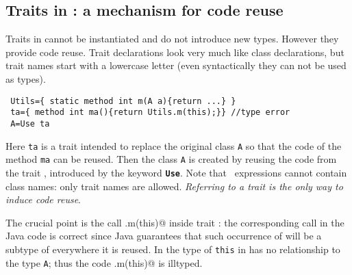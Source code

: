 \saveSpace
\subsection{Traits in \name: a mechanism for code reuse}
\saveSpace
Traits in \name cannot be instantiated and do not introduce new
types. However they provide code reuse.
Trait declarations 
look very much like class declarations, but trait names 
start with a lowercase letter (even syntactically they can not be used as types).
\saveSpace\saveSpace
\begin{lstlisting}
 Utils={ static method int m(A a){return ...} }
 ta={ method int ma(){return Utils.m(this);}} //type error
 A=Use ta
\end{lstlisting}
\saveSpace\saveSpace
\noindent Here \lstinline{ta} is a trait intended to replace the
original class \lstinline{A} so that the code of the method
\lstinline{ma} can be reused. Then the class \lstinline{A} 
is created by reusing the code from the trait \Q@ta@, introduced by the keyword 
{\bf \lstinline{Use}}. Note that \use\ expressions cannot contain class names: only trait
names are allowed.
\emph{Referring to a trait is the only way to induce code reuse}.

The crucial point is the call \Q@Utils.m(this)@ inside trait \Q@ta@:
the corresponding call in the Java code is correct since Java guarantees that such occurrence of \Q@this@ will be a subtype of \Q@A@ everywhere it is reused.
In \name 
the type of \lstinline{this} in
\Q@ta@ has no relationship to the type \lstinline{A};
thus the code \Q@Utils.m(this)@ is illtyped.

